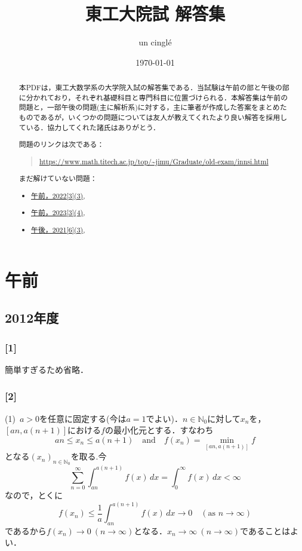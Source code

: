 \documentclass[a4j]{ltjsarticle}
\newcommand{\Nset}{\mathbb{N}}
\newcommand{\1}{\mathbbm{1}}
\numberwithin{equation}{section}
\theoremstyle{definition}
\begin{document}
\title{東工大院試 解答集}
\author{un cinglé}
\date{\today}
\maketitle
\begin{abstract}
    本PDFは，東工大数学系の大学院入試の解答集である．当試験は午前の部と午後の部に分かれており，それぞれ基礎科目と専門科目に位置づけられる．本解答集は午前の問題と，一部午後の問題(主に解析系)に対する，主に筆者が作成した答案をまとめたものであるが，いくつかの問題については友人が教えてくれたより良い解答を採用している．協力してくれた諸氏はありがとう．

    問題のリンクは次である：
    \begin{quote}
        \url{https://www.math.titech.ac.jp/top/~jimu/Graduate/old-exam/innsi.html}
    \end{quote}
    まだ解けていない問題：
    \begin{itemize}
        \item \hyperref[am_2022_3]{午前，2022[3](3)},
        \item \hyperref[am_2023_3]{午前，2023[3](4)},
    
        \item \hyperref[pm_2021_6]{午後，2021[6](3)},
    \end{itemize}
\end{abstract}
\tableofcontents

\newpage 

\section{午前}
\subsection{2012年度}
\subsubsection*{[1]}
簡単すぎるため省略．
\subsubsection*{[2]}
(1)\ $a>0$を任意に固定する(今は$a=1$でよい)．$n\in\Nset_0$に対して$x_n$を，$[an,a(n+1)]$における$f$の最小化元とする．すなわち
\begin{equation}
    an\leq x_n\leq a(n+1)\quad \text{and}\quad f(x_n)=\min_{[an,a(n+1)]}f 
\end{equation}
となる$(x_n)_{n\in\Nset_{0}}$を取る.今
\begin{equation}
    \sum_{n=0}^\infty \int_{an}^{a(n+1)}f(x)\,dx=\int_{0}^\infty f(x)\,dx<\infty 
\end{equation}
なので，とくに
\begin{equation}
    f(x_n)\leq \frac{1}{a}\int_{an}^{a(n+1)}f(x)\,dx\to 0\quad (\text{as $n\to\infty $})
\end{equation}
であるから$f(x_n)\to0\ (n\to\infty)$となる．$x_n\to\infty\ (n\to\infty)$であることはよい．
\end{document}
